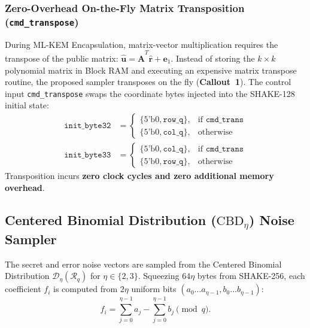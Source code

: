 \subsubsection{Zero-Overhead On-the-Fly Matrix Transposition (\texttt{cmd\_transpose})}
During \mbox{ML-KEM} Encapsulation, matrix-vector multiplication requires the transpose of the public matrix: $\hat{\mathbf{u}} = \hat{\mathbf{A}}^T \hat{\mathbf{r}} + \mathbf{e}_1$. Instead of storing the $k \times k$ polynomial matrix in Block RAM and executing an expensive matrix transpose routine, the proposed sampler transposes on the fly (\textbf{Callout~1}). The control input \texttt{cmd\_transpose} swaps the coordinate bytes injected into the SHAKE-128 initial state:
\begin{align}
\texttt{init\_byte32} &= \begin{cases} \{5\text{'b}0, \texttt{row\_q}\}, & \text{if } \texttt{cmd\_trans} \\ \{5\text{'b}0, \texttt{col\_q}\}, & \text{otherwise} \end{cases} \label{eq:transpose_byte32} \\
\texttt{init\_byte33} &= \begin{cases} \{5\text{'b}0, \texttt{col\_q}\}, & \text{if } \texttt{cmd\_trans} \\ \{5\text{'b}0, \texttt{row\_q}\}, & \text{otherwise} \end{cases} \label{eq:transpose_byte33}
\end{align}
Transposition incurs \textbf{zero clock cycles and zero additional memory overhead}.

\subsection{Centered Binomial Distribution (\texorpdfstring{$\text{CBD}_\eta$}{CBD\_eta}) Noise Sampler}
\label{sec:cbd_sampler}

The secret and error noise vectors are sampled from the Centered Binomial Distribution $\mathcal{D}_\eta(\mathcal{R}_q)$ for $\eta \in \{2, 3\}$. Squeezing $64\eta$ bytes from SHAKE-256, each coefficient $f_i$ is computed from $2\eta$ uniform bits $(a_0 \dots a_{\eta-1}, b_0 \dots b_{\eta-1})$:
\begin{equation}
f_i = \sum_{j=0}^{\eta-1} a_j - \sum_{j=0}^{\eta-1} b_j \pmod q.
\label{eq:cbd_math}
\end{equation}

